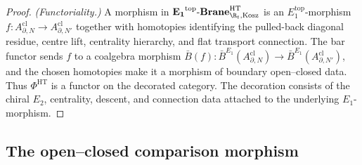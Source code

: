\begin{proof}
\emph{(Functoriality.)}
A morphism in
\(\mathbf{E_1}^{\mathrm{top}}\text{-}\mathbf{Brane}^{\mathrm{HT}}_{\R_t,\mathrm{Kosz}}\)
is an \(E_1^{\mathrm{top}}\)-morphism
\(f\colon A^{\mathrm{cl}}_{\partial,N}\to A^{\mathrm{cl}}_{\partial,N'}\)
together with homotopies identifying the pulled-back diagonal residue,
centre lift, centrality hierarchy, and flat transport connection.  The bar
functor sends \(f\) to a coalgebra morphism
\(\bar B(f)\colon\bar B^{E_1}(A^{\mathrm{cl}}_{\partial,N})\to
\bar B^{E_1}(A^{\mathrm{cl}}_{\partial,N'})\), and the chosen
homotopies make it a morphism of boundary open--closed data.  Thus
\(\Phi^{\mathrm{HT}}\) is a functor on the decorated category.  The
decoration consists of the chiral \(E_2\), centrality, descent, and
connection data attached to the underlying \(E_1\)-morphism.
\end{proof}

\subsection{The open--closed comparison morphism}
\label{ssec:oca}

